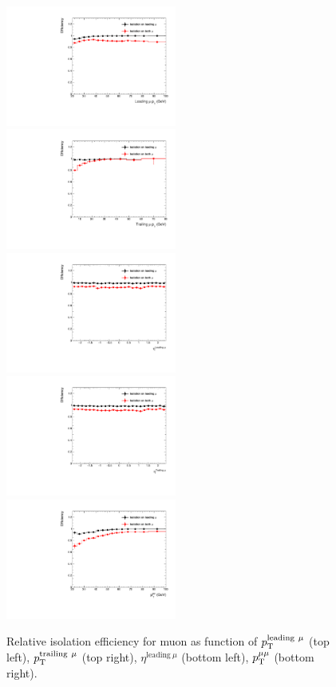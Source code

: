 		\begin{figure}[p]
		  \centering
		  \includegraphics[width=0.5\textwidth]{Fig/EffIso/EffIso_LeadMuPt}~
		  \includegraphics[width=0.5\textwidth]{Fig/EffIso/Eff_Iso_TrailMuPt}\\
		  \includegraphics[width=0.5\textwidth]{Fig/EffIso/EffIso_LeadMuEta}~
		  \includegraphics[width=0.5\textwidth]{Fig/EffIso/EffIso_TrailMuEta}\\
		  \includegraphics[width=0.5\textwidth]{Fig/EffIso/EffIso_DimuPt}\\
		  \caption{Relative isolation efficiency for muon as function of $p_{\mathrm{T}}^{\text{leading}\ \mu}$ (top left), $p_{\mathrm{T}}^{\text{trailing}\ \mu}$ (top right), $\eta^{\text{leading}\ \mu}$ (bottom left), $p_{\mathrm{T}}^{\mu\mu}$ (bottom right).\label{fig:IsoEff}}
		\end{figure}	
		

